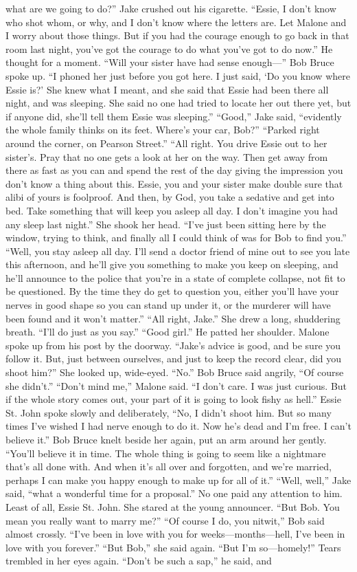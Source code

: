 \documentclass{novel}
\begin{document}
what are we going to do?” Jake crushed out his cigarette. “Essie, I don’t know who shot whom, or why, and I don’t know where the letters are. Let Malone and I worry about those things. But if you had the courage enough to go back in that room last night, you’ve got the courage to do what you’ve got to do now.” He thought for a moment. “Will your sister have had sense enough—” Bob Bruce spoke up. “I phoned her just before you got here. I just said, ‘Do you know where Essie is?’ She knew what I meant, and she said that Essie had been there all night, and was sleeping. She said no one had tried to locate her out there yet, but if anyone did, she’ll tell them Essie was sleeping.” “Good,” Jake said, “evidently the whole family thinks on its feet. Where’s your car, Bob?” “Parked right around the corner, on Pearson Street.” “All right. You drive Essie out to her sister’s. Pray that no one gets a look at her on the way. Then get away from there as fast as you can and spend the rest of the day giving the impression you don’t know a thing about this. Essie, you and your sister make double sure that alibi of yours is foolproof. And then, by God, you take a sedative and get into bed. Take something that will keep you asleep all day. I don’t imagine you had any sleep last night.” She shook her head. “I’ve just been sitting here by the window, trying to think, and finally all I could think of was for Bob to find you.” “Well, you stay asleep all day. I’ll send a doctor friend of mine out to see you late this afternoon, and he’ll give you something to make you keep on sleeping, and he’ll announce to the police that you’re in a state of complete collapse, not fit to be questioned. By the time they do get to question you, either you’ll have your nerves in good shape so you can stand up under it, or the murderer will have been found and it won’t matter.” “All right, Jake.” She drew a long, shuddering breath. “I’ll do just as you say.” “Good girl.” He patted her shoulder. Malone spoke up from his post by the doorway. “Jake’s advice is good, and be sure you follow it. But, just between ourselves, and just to keep the record clear, did you shoot him?” She looked up, wide-eyed. “No.” Bob Bruce said angrily, “Of course she didn’t.” “Don’t mind me,” Malone said. “I don’t care. I was just curious. But if the whole story comes out, your part of it is going to look fishy as hell.” Essie St. John spoke slowly and deliberately, “No, I didn’t shoot him. But so many times I’ve wished I had nerve enough to do it. Now he’s dead and I’m free. I can’t believe it.” Bob Bruce knelt beside her again, put an arm around her gently. “You’ll believe it in time. The whole thing is going to seem like a nightmare that’s all done with. And when it’s all over and forgotten, and we’re married, perhaps I can make you happy enough to make up for all of it.” “Well, well,” Jake said, “what a wonderful time for a proposal.” No one paid any attention to him. Least of all, Essie St. John. She stared at the young announcer. “But Bob. You mean you really want to marry me?” “Of course I do, you nitwit,” Bob said almost crossly. “I’ve been in love with you for weeks—months—hell, I’ve been in love with you forever.” “But Bob,” she said again. “But I’m so—homely!” Tears trembled in her eyes again. “Don’t be such a sap,” he said, and 
\end{document}
